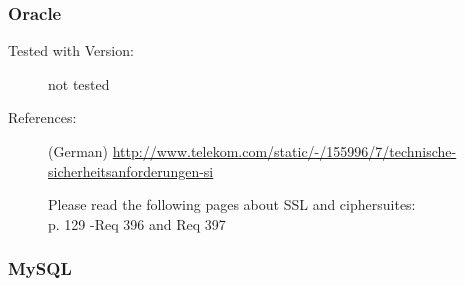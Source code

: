 
\subsubsection{Oracle}
\begin{description}
\item[Tested with Version:] not tested

\item[References:] (German)
{\small \url{http://www.telekom.com/static/-/155996/7/technische-sicherheitsanforderungen-si}}

Please read the following pages about SSL and ciphersuites:\\
p. 129 -Req 396 and Req 397 \\

\end{description}





\subsubsection{MySQL}

